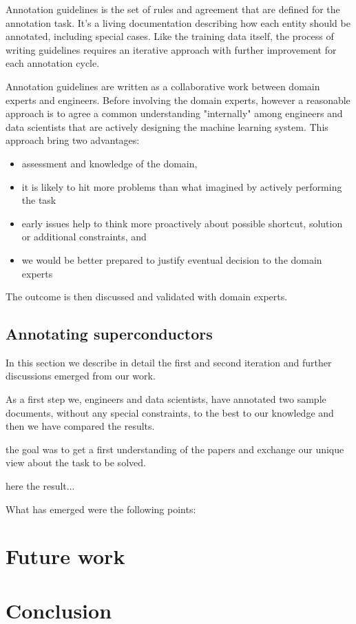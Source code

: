 \documentclass{article}
\begin{document}
Annotation guidelines is the set of rules and agreement that are defined for the annotation task. It's a living documentation describing how each entity should be annotated, including special cases. 
Like the training data itself, the process of writing guidelines requires an iterative approach with further improvement for each annotation cycle. 

Annotation guidelines are written as a collaborative work between domain experts and engineers. Before involving the domain experts, however a reasonable approach is to agree a common understanding "internally" among engineers and data scientists that are actively designing the machine learning system. 
This approach bring two advantages: 
\begin{itemize}
    \item assessment and knowledge of the domain, 
    \item it is likely to hit more problems than what imagined by actively performing the task 
    \item early issues help to think more proactively about possible shortcut, solution or additional constraints, and 
    \item we would be better prepared to justify eventual decision to the domain experts
\end{itemize}

The outcome is then discussed and validated with domain experts. 

\subsection{Annotating superconductors}
In this section we describe in detail the first and second iteration and further discussions emerged from our work.

As a first step we, engineers and data scientists, have annotated two sample documents, without any special constraints, to the best to our knowledge and then we have compared the results. 

the goal was to get a first understanding of the papers and exchange our unique view about the task to be solved. 

here the result...


What has emerged were the following points: 

\section{Future work}
\section{Conclusion}

\listoffigures



\end{document}
